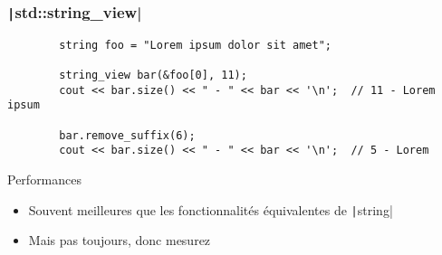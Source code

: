 \documentclass[C++.tex]{subfiles}
\begin{document}
\begin{frame}[fragile]
	\frametitle{\texttt|std::string_view|}
	\begin{verbatim}
		string foo = "Lorem ipsum dolor sit amet";

		string_view bar(&foo[0], 11);
		cout << bar.size() << " - " << bar << '\n';  // 11 - Lorem ipsum

		bar.remove_suffix(6);
		cout << bar.size() << " - " << bar << '\n';  // 5 - Lorem
	\end{verbatim}

	\begin{exampleblock}{Performances}
		\begin{itemize}
			\item Souvent meilleures que les fonctionnalités équivalentes de \texttt|string|
			\item Mais pas toujours, donc mesurez
		\end{itemize}
	\end{exampleblock}


\end{frame}
\end{document}
